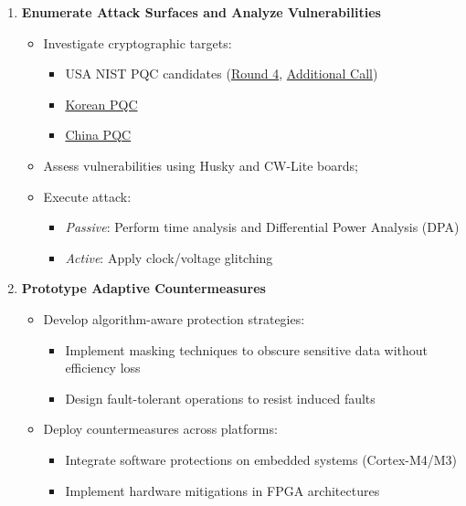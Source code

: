 \documentclass[11pt, a4paper]{article}
\begin{document}
\begin{enumerate}
\item \textbf{Enumerate Attack Surfaces and Analyze Vulnerabilities} 
\begin{itemize}[leftmargin=2em] 
\item Investigate cryptographic targets: 
\begin{itemize} \item USA NIST PQC candidates 
(\href{https://csrc.nist.gov/projects/post-quantum-cryptography/round-4-submissions}{Round 4}, 
\href{https://csrc.nist.gov/projects/pqc-dig-sig/round-2-additional-signatures}{Additional Call}) 
\item \href{https://www.kpqc.or.kr/competition.html}{Korean PQC} 
\item \href{https://niccs.org.cn/en/notice/}{China PQC} 
\end{itemize} 
\item Assess vulnerabilities using Husky and CW-Lite boards; 
\item Execute attack: 
    \begin{itemize} 
    \item \textit{Passive}: Perform time analysis and Differential Power Analysis (DPA) 
    \item \textit{Active}: Apply clock/voltage glitching 
    \end{itemize} 
\end{itemize}

\item \textbf{Prototype Adaptive Countermeasures}
\begin{itemize}[leftmargin=2em]
    \item Develop algorithm-aware protection strategies:
    \begin{itemize}
        \item Implement masking techniques to obscure sensitive data without efficiency loss
        \item Design fault-tolerant operations to resist induced faults
    \end{itemize}
    \item Deploy countermeasures across platforms:
    \begin{itemize}
        \item Integrate software protections on embedded systems (Cortex-M4/M3)
        \item Implement hardware mitigations in FPGA architectures
    \end{itemize}
\end{itemize}


\end{enumerate}
\end{document}
